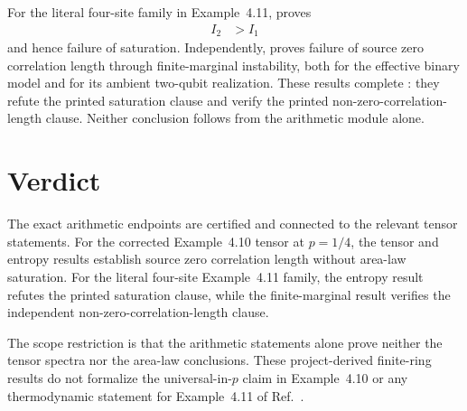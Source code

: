\documentclass{article}
\begin{document}
For the literal four-site family in Example~4.11,
 proves
\begin{align}
    I_2
        &> I_1
    \label{eq:cpsv16_exact_arithmetic_scope_example411_mutual_information_defect}
\end{align}
and hence failure of saturation. Independently,
 proves failure of source zero
correlation length through finite-marginal instability, both for the effective
binary model and for its ambient two-qubit realization. These results complete
: they refute the printed saturation clause and verify the
printed non-zero-correlation-length clause. Neither conclusion follows from
the arithmetic module alone.

\section{Verdict}

The exact arithmetic endpoints are certified and connected to the relevant
tensor statements. For the corrected Example~4.10 tensor at $p=1/4$, the
tensor and entropy results establish source zero correlation length without
area-law saturation. For the literal four-site Example~4.11 family, the
entropy result refutes the printed saturation clause, while the finite-marginal
result verifies the independent non-zero-correlation-length clause.

The scope restriction is that the arithmetic statements alone prove neither
the tensor spectra nor the area-law conclusions. These project-derived
finite-ring results do not formalize the universal-in-$p$ claim in
Example~4.10 or any thermodynamic statement for Example~4.11 of
Ref.~\cite{Cirac2016MPDO_arXiv}.



\end{document}
